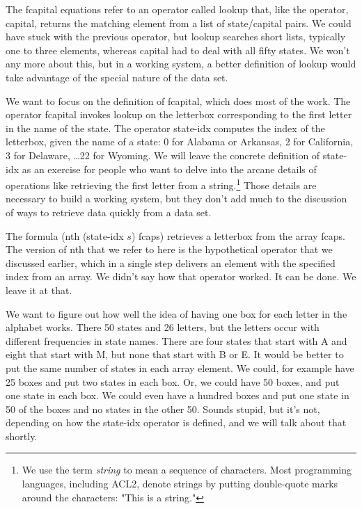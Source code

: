 The \textsf{fcapital} equations refer to an operator
called \textsf{lookup} that, like the operator, \textsf{capital},
returns the matching element from a list of state/capital pairs.
We could have stuck with the previous operator,
but \textsf{lookup} searches short lists,
typically one to three elements,
whereas \textsf{capital} had to deal with all fifty states.
We won't any more about this, but in a working system,
a better definition of \textsf{lookup}
would take advantage of the special nature of the data set.

We want to focus on the definition of \textsf{fcapital},
which does most of the work.
The operator \textsf{fcapital} invokes \textsf{lookup}
on the letterbox corresponding to the first letter
in the name of the state.
The operator \textsf{state-idx} computes the index
of the letterbox, given the name of a state:
0 for Alabama or Arkansas, 2 for California,
3 for Delaware, \dots 22 for  Wyoming.
We will leave the concrete
definition of \textsf{state-idx} as an exercise for
people who want to delve into the arcane details of
operations like retrieving the first letter from a
string.\footnote{We use the term \emph{string}
to mean a sequence of characters.
Most programming languages, including ACL2,
denote strings by putting double-quote marks
around the characters: \textsf{"This is a string."}}
Those details are necessary to build a working system,
but they don't add much to the discussion of ways
to retrieve data quickly from a data set.

The formula
\textsf{(nth (state-idx $s$) fcaps)}
retrieves a letterbox from the array \textsf{fcaps}.
The version of \textsf{nth} that we refer to here
is the hypothetical operator that we discussed earlier,
which in a single step delivers an element
with the specified index from an array.
We didn't say how that operator worked.
It can be done. We leave it at that.

We want to figure out
how well the idea of having one box for each letter
in the alphabet works.
There 50 states and 26 letters, but the letters occur
with different frequencies in state names.
There are four states that start with A and
eight that start with M,
but none that start with B or E.
It would be better to put the same number of states in each
array element. We could, for example have 25 boxes and put
two states in each box. Or, we could have 50 boxes, and put
one state in each box.
We could even have a hundred boxes and put one state in 50
of the boxes and no states in the other 50.
Sounds stupid, but it's not, depending on how
the \textsf{state-idx} operator is defined,
and we will talk about that shortly.


